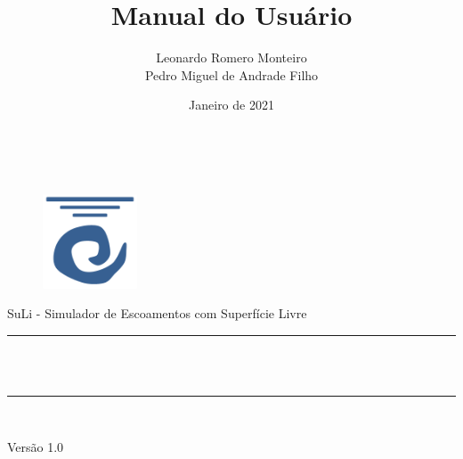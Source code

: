 \documentclass[12pt, a4paper]{article}
\title{Manual do Usuário}
\author{
  Leonardo Romero Monteiro \\[.5 cm]
  Pedro Miguel de Andrade Filho \\[.5 cm]
}
\date{Janeiro de 2021}
\makeatletter
\let\thetitle\@title
\let\theauthor\@author
\let\thedate\@date
\makeatother
\begin{document}
\begin{titlepage}
$ $

\vspace{3cm}
\begin{center}

\begin{figure}[htp]
\centering
\includegraphics[width=0.25\textwidth]{suli}
\end{figure}

\vspace{1cm}


{\LARGE SuLi - Simulador de Escoamentos com Superfície Livre}

	\noindent\rule{\linewidth}{0.2 mm} \\[1 cm]
	{\LARGE \bfseries \thetitle}\\[.7 cm]
	\rule{\linewidth}{0.2 mm} \\[1 cm]
	

	{ \Large \theauthor}
	\end{center}


\vspace{6cm}

	\begin{flushleft}
	{\Large Versão 1.0 \\  \thedate}
	\end{flushleft}
	
\end{titlepage}


\newpage
\end{document}
